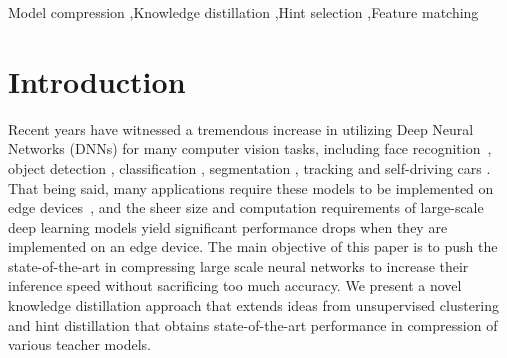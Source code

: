 \documentclass[final,3p,times]{elsarticle}
\begin{document}
\begin{frontmatter}

\begin{keyword}
Model compression \sep Knowledge distillation \sep Hint selection \sep Feature matching



\end{keyword}

\end{frontmatter}


\section{Introduction}
\label{intro}
Recent years have witnessed a tremendous increase in utilizing Deep Neural Networks (DNNs) for many computer vision tasks, including face recognition~\citep{facerecognition}, object detection \citep{yolov3}, classification \citep{alexnet,resnet}, segmentation \citep{seg2012}, tracking \citep{tracking2020} and self-driving cars \citep{self_driving2018}. That being said, many applications require these models to be implemented on edge devices~\citep{sze2017efficient}, and the sheer size and computation requirements of large-scale deep learning models yield significant performance drops when they are implemented on an edge device. The main objective of this paper is to push the state-of-the-art in compressing large scale neural networks to increase their inference speed without sacrificing too much accuracy. We present a novel knowledge distillation approach that extends ideas from unsupervised clustering and hint distillation that obtains state-of-the-art performance in compression of various teacher models.
\end{document}
